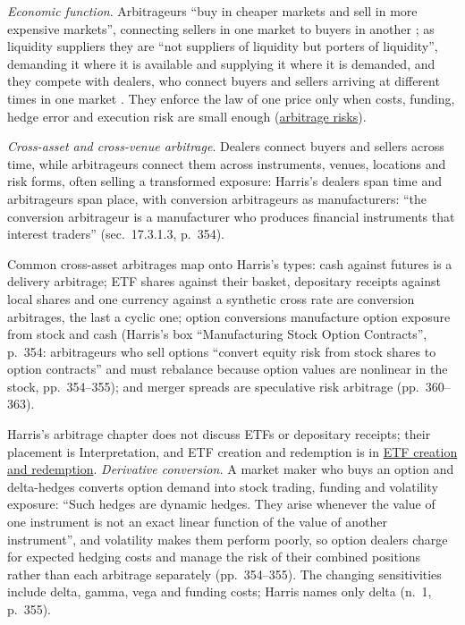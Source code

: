 \begin{qfdefinition}
\emph{Economic function}. Arbitrageurs ``buy in cheaper markets and sell in more expensive markets'', connecting sellers in one market to buyers in another \citep[chap.~1, p.~6]{alpha-harris}; as liquidity suppliers they are ``not suppliers of liquidity but porters of liquidity'', demanding it where it is available and supplying it where it is demanded, and they compete with dealers, who connect buyers and sellers arriving at different times in one market \citep[chap.~``Liquidity'', sec.~19.3.6, pp.~404--405]{alpha-harris}. They enforce the law of one price only when costs, funding, hedge error and execution risk are small enough (\hyperref[res:arbitrage-risks]{arbitrage risks}).

\emph{Cross-asset and cross-venue arbitrage}. Dealers connect buyers and sellers across time, while arbitrageurs connect them across instruments, venues, locations and risk forms, often selling a transformed exposure: Harris's dealers span time and arbitrageurs span place, with conversion arbitrageurs as manufacturers: ``the conversion arbitrageur is a manufacturer who produces financial instruments that interest traders'' (sec.~17.3.1.3, p.~354).

Common cross-asset arbitrages map onto Harris's types: cash against futures is a delivery arbitrage; ETF shares against their basket, depositary receipts against local shares and one currency against a synthetic cross rate are conversion arbitrages, the last a cyclic one; option conversions manufacture option exposure from stock and cash (Harris's box ``Manufacturing Stock Option Contracts'', p.~354: arbitrageurs who sell options ``convert equity risk from stock shares to option contracts'' and must rebalance because option values are nonlinear in the stock, pp.~354--355); and merger spreads are speculative risk arbitrage (pp.~360--363).

Harris's arbitrage chapter does not discuss ETFs or depositary receipts; their placement is Interpretation, and ETF creation and redemption is in \hyperref[mech:etf-creation-redemption]{ETF creation and redemption}. \emph{Derivative conversion.} A market maker who buys an option and delta-hedges converts option demand into stock trading, funding and volatility exposure: ``Such hedges are dynamic hedges. They arise whenever the value of one instrument is not an exact linear function of the value of another instrument'', and volatility makes them perform poorly, so option dealers charge for expected hedging costs and manage the risk of their combined positions rather than each arbitrage separately (pp.~354--355). The changing sensitivities include delta, gamma, vega and funding costs; Harris names only delta (n.~1, p.~355).


\end{qfdefinition}
